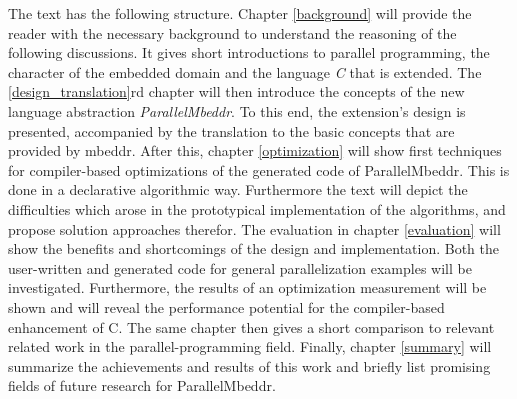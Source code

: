 The text has the following structure. Chapter \ref{background} will provide the reader with the necessary background to understand the reasoning of the following discussions. It gives short introductions to parallel programming, the character of the embedded domain and the language \textit{C} that is extended. The \ref{design_translation}rd chapter  will then introduce the concepts of the new language abstraction \textit{ParallelMbeddr}. To this end, the extension's design is presented, accompanied by the translation to the basic concepts that are provided by mbeddr. After this, chapter \ref{optimization} will show first techniques for compiler-based optimizations of the generated code of ParallelMbeddr. This is done in a declarative algorithmic way. Furthermore the text will depict the difficulties which arose in the prototypical implementation of the algorithms, and propose solution approaches therefor. The evaluation in chapter \ref{evaluation} will show the benefits and shortcomings of the design and implementation. Both the user-written and generated code for general parallelization examples will be investigated. Furthermore, the results of an optimization measurement will be shown and will reveal the performance potential for the compiler-based enhancement of C. The same chapter then gives a short comparison to relevant related work in the parallel-programming field.
Finally, chapter \ref{summary} will summarize the achievements and results of this work and briefly list promising fields of future research for ParallelMbeddr.
